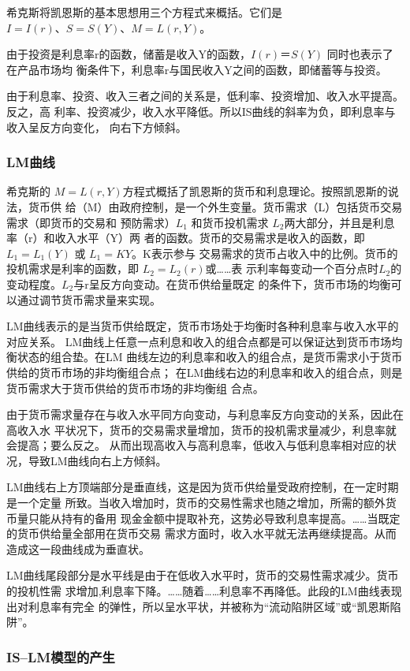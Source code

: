 希克斯将凯恩斯的基本思想用三个方程式来概括。它们是$I = I(r)、S=S(Y)、M = L(r,Y)$。

由于投资是利息率r的函数，储蓄是收入Y的函数，$I(r)＝S(Y)$ 同时也表示了在产品市场均
衡条件下，利息率r与国民收入Y之间的函数，即储蓄等与投资。

由于利息率、投资、收入三者之间的关系是，低利率、投资增加、收入水平提高。反之，高
利率、投资减少，收入水平降低。所以IS曲线的斜率为负，即利息率与收入呈反方向变化，
向右下方倾斜。

\subsubsection{LM曲线}

希克斯的 $M = L(r,Y)$方程式概括了凯恩斯的货币和利息理论。按照凯恩斯的说法，货币供
给（M）由政府控制，是一个外生变量。货币需求（L）包括货币交易需求（即货币的交易和
预防需求）$L_1$ 和货币投机需求 $L_2$两大部分，并且是利息率（r）和收入水平（Y）两
者的函数。货币的交易需求是收入的函数，即 $L_1 = L_1(Y)$ 或 $L_1 = KY$。K表示参与
交易需求的货币占收入中的比例。货币的投机需求是利率的函数，即 $L_2 = L_2(r)$或……表
示利率每变动一个百分点时$L_2$的变动程度。$L_2$与r呈反方向变动。在货币供给量既定
的条件下，货币市场的均衡可以通过调节货币需求量来实现。

LM曲线表示的是当货币供给既定，货币市场处于均衡时各种利息率与收入水平的对应关系。
LM曲线上任意一点利息和收入的组合点都是可以保证达到货币市场均衡状态的组合垫。在LM
曲线左边的利息率和收入的组合点，是货币需求小于货币供给的货币市场的非均衡组合点；
在LM曲线右边的利息率和收入的组合点，则是货币需求大于货币供给的货币市场的非均衡组
合点。

由于货币需求量存在与收入水平同方向变动，与利息率反方向变动的关系，因此在高收入水
平状况下，货币的交易需求量增加，货币的投机需求量减少，利息率就会提高；要么反之。
从而出现高收入与高利息率，低收入与低利息率相对应的状况，导致LM曲线向右上方倾斜。

LM曲线右上方顶端部分是垂直线，这是因为货币供给量受政府控制，在一定时期是一个定量
所致。当收入增加时，货币的交易性需求也随之增加，所需的额外货币量只能从持有的备用
现金金额中提取补充，这势必导致利息率提高。……当既定的货币供给量全部用在货币交易
需求方面时，收入水平就无法再继续提高。从而造成这一段曲线成为垂直状。

LM曲线尾段部分是水平线是由于在低收入水平时，货币的交易性需求减少。货币的投机性需
求增加,利息率下降。……随着……利息率不再降低。此段的LM曲线表现出对利息率有完全 的弹性，所以呈水平状，并被称为“流动陷阱区域”或“凯恩斯陷阱”。 \subsubsection{IS--LM模型的产生}


